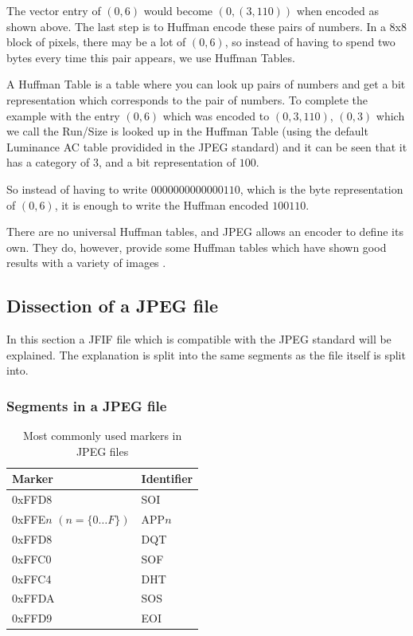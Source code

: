 \begin{infobox}
The vector entry of $(0,6)$ would become $(0,(3,110))$ when encoded as shown above. The last step is to Huffman encode these pairs of numbers.
In a 8x8 block of pixels, there may be a lot of $(0,6)$, so instead of having to spend two bytes every time this pair appears, we use Huffman Tables. 

A Huffman Table is a table where you can look up pairs of numbers and get a bit representation which corresponds to the pair of numbers. To complete the example with the entry $(0,6)$ which was encoded to $(0,3,110)$, $(0,3)$ which we call the Run/Size is looked up in the Huffman Table (using the default Luminance AC table providided in the JPEG standard) and it can be seen that it has a category of $3$, and a bit representation of $100$. 

So instead of having to write $0000 0000 0000 0110$, which is the byte representation of $(0,6)$, it is enough to write the Huffman encoded $100110$.

There are no universal Huffman tables, and JPEG allows an encoder to define its own. They do, however, provide some Huffman tables which have shown good results with a variety of images \citep[p. 153]{JPEGStandard}. 

\vspace{4mm}
\subsection{Dissection of a JPEG file}
\vspace{-2.5mm}
In this section a JFIF file which is compatible with the JPEG standard will be explained. The explanation is split into the same segments as the file itself is split into.
\newpage
\subsubsection{Segments in a JPEG file}
\begin{table}
\caption{Most commonly used markers in JPEG files}
\label{tab:markers}
\begin{tabular}{|p{2.7cm}|l|}
\hline
Marker & Identifier\\ \hline
0xFFD8 & SOI\\ \hline
0xFFE$n$ \newline$(n = \{0 \ldots F\})$ & APP$n$\\ \hline
0xFFD8 & DQT \\ \hline
0xFFC0 & SOF \\ \hline
0xFFC4 & DHT\\ \hline
0xFFDA & SOS\\ \hline
0xFFD9 & EOI\\ \hline 
\end{tabular}
\end{table}


\end{infobox}
